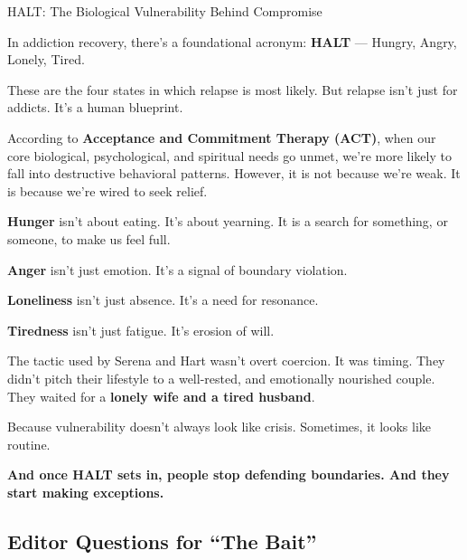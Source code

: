 \begin{TechnicalSidebar}{HALT: The Biological Vulnerability Behind Compromise}

  In addiction recovery, there’s a foundational acronym: \textbf{HALT} — Hungry, Angry, Lonely, Tired.

  \medskip
  
  These are the four states in which relapse is most likely.  
  But relapse isn’t just for addicts. It’s a human blueprint.
  
  \medskip
  
  According to \textbf{Acceptance and Commitment Therapy (ACT)}, when our core biological, psychological, 
  and spiritual needs go unmet, we’re 
  more likely to fall into destructive behavioral patterns. However, it is not because we’re weak. 
  It is because we’re wired to seek relief.  
  
  \medskip
  
  \textbf{Hunger} isn’t about eating. It’s about yearning.
  It is a search for something, or someone, to make us feel full.

  \medskip

  \textbf{Anger} isn’t just emotion. It’s a signal of boundary violation.  

  \medskip

  \textbf{Loneliness} isn’t just absence. It’s a need for resonance.  

  \medskip

  \textbf{Tiredness} isn’t just fatigue. It’s erosion of will.
  
  \medskip
  
  The tactic used by Serena and Hart wasn’t overt coercion. It was timing.  
  They didn’t pitch their lifestyle to a well-rested, and emotionally nourished couple.  
  They waited for a \textbf{lonely wife and a tired husband}.

  \medskip
  
  Because vulnerability doesn’t always look like crisis.  
  Sometimes, it looks like routine.
  
  \medskip
  
  \textbf{And once HALT sets in, people stop defending boundaries. And they start making exceptions.}

\end{TechnicalSidebar}



\subsection{Editor Questions for ``The Bait''}

